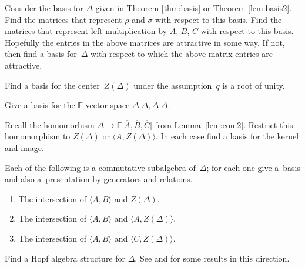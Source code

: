\documentclass[pdftex]{sigma}
\numberwithin{equation}{section}
\begin{document}
\begin{Problem}
Consider the basis for $\Delta$ given in
Theorem \ref{thm:basis} or
Theorem \ref{lem:basis2}.
Find the matrices that represent $\rho$ and $\sigma$
with respect to this basis.
Find the matrices that represent left-multiplication
by $A$, $B$, $C$ with respect to this basis.
Hopefully the entries in the above matrices are attractive
in some way.
If not, then f\/ind a  basis for~$\Delta $
with respect to which the above matrix entries are
attractive.
\end{Problem}

\begin{Problem}
Find a basis for the center~$Z(\Delta)$ under the assumption~$q$ is a root of unity.
\end{Problem}


\begin{Problem}
Give a basis for the $\mathbb F$-vector space
$\Delta \lbrack \Delta, \Delta \rbrack \Delta $.
\end{Problem}

\begin{Problem}
Recall the homomorhism $\Delta \to \mathbb F\lbrack \overline A,\overline B,
\overline C\rbrack $ from Lemma~\ref{lem:com2}. Restrict  this homomorphism
to $Z(\Delta)$ or $\langle A,Z(\Delta)\rangle$. In
each case
f\/ind a basis for the kernel and
image.
\end{Problem}


\begin{Problem}
Each of the following is a commutative subalgebra of~$\Delta$;
for each one give
a~basis and also a~presentation by generators and
relations.
\begin{enumerate}\itemsep=0pt
\item[$(i)$]
The intersection of
$\langle A,B\rangle$ and
$Z(\Delta)$.
\item[$(ii)$]
The intersection of $\langle A,B\rangle$ and
$\langle A, Z(\Delta) \rangle$.
\item[$(iii)$]
The intersection of
$\langle A,B\rangle$ and
$\langle C, Z(\Delta) \rangle$.
\end{enumerate}
\end{Problem}




\begin{Problem}
Find a Hopf algebra structure for $\Delta $.
See
\cite[Proposition~4.1]{basnc} and
\cite[Theorem~6.10]{ciccoli}
for some results in this direction.
\end{Problem}
\end{document}
